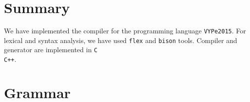 \documentclass[a4paper, 11pt, titlepage, final]{article}
\begin{document}
\section{Summary}

We have implemented the compiler for the programming language \texttt{VYPe2015}. For lexical and syntax analysis, we have used \texttt{flex} and \texttt{bison} tools. Compiler and generator are implemented in \texttt{C\\C++}.

\newpage

\appendix

\section{Grammar} \label{grammar}

{ \tabcolsep=6pt
{\small
 \begin{tabular}{lrrccl}
    
 \end{tabular}
}}

\end{document}
